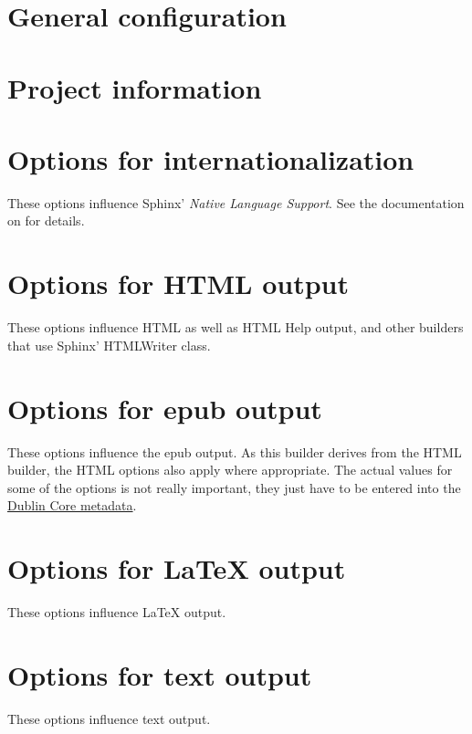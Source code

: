 \documentclass[letterpaper,10pt,english]{sphinxmanual}
\begin{document}
\section{General configuration}
\label{config:general-configuration}

\section{Project information}
\label{config:project-information}

\section{Options for internationalization}
\label{config:options-for-internationalization}\label{config:intl-options}
These options influence Sphinx' \emph{Native Language Support}.  See the
documentation on {\hyperref[intl:intl]{}} for details.


\section{Options for HTML output}
\label{config:options-for-html-output}\label{config:html-options}
These options influence HTML as well as HTML Help output, and other builders
that use Sphinx' HTMLWriter class.


\section{Options for epub output}
\label{config:epub-options}\label{config:options-for-epub-output}
These options influence the epub output.  As this builder derives from the HTML
builder, the HTML options also apply where appropriate.  The actual values for
some of the options is not really important, they just have to be entered into
the \href{http://dublincore.org/}{Dublin Core metadata}.


\section{Options for LaTeX output}
\label{config:options-for-latex-output}\label{config:latex-options}
These options influence LaTeX output.


\section{Options for text output}
\label{config:text-options}\label{config:options-for-text-output}
These options influence text output.
\end{document}

